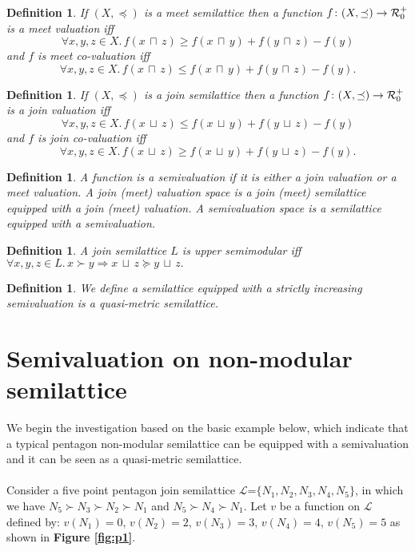 \documentclass{article}
\newtheorem{definition}[theorem]{\bf Definition}
\begin{document}
\begin{definition}

If $(X,\preceq)$ is a meet semilattice then a
 function $f \colon (X,\preceq) \rightarrow \mbox{$\cal{R}$}^{+}_{0}$ is a {\it
 meet valuation} iff 
$$\forall x,y,z\in X. \, f(x \, \sqcap \,  z) \geq f(x \, \sqcap \, 
y) + f(y \, \sqcap \,  z) - f(y) $$ and $f$ is {\it meet co-valuation} iff $$\forall
x,y,z\in X. \, f(x \, \sqcap \,  z) \leq f(x \, \sqcap \, 
y) + f(y \, \sqcap \,  z) - f(y).$$
\end{definition}

\begin{definition}

If $(X,\preceq)$ is a join semilattice then a
 function $f \colon (X,\preceq) \rightarrow \mbox{$\cal{R}$}^{+}_{0}$ is a
 {\it join valuation} iff $$\forall x,y,z\in X. \, f(x \, \sqcup \,  z) \leq f(x \, \sqcup \,  y) + f(y \, \sqcup \, 
 z) -f(y)   $$ and $f$ is {\it join co-valuation} iff 
$$\forall x,y,z\in X. \, f(x \, \sqcup \,  z) \geq f(x \, \sqcup \,  y) + f(y \, \sqcup \,  z) -f(y)  .$$
\end{definition}

\begin{definition} 
A function is a {\it semivaluation} if it is either a join valuation or a meet valuation. A join (meet) valuation space is a join (meet) semilattice 
equipped with a join (meet) valuation. A {\it semivaluation space} is a
semilattice equipped with a semivaluation. 
\end{definition}

\begin{definition} A join semilattice $L$ is upper semimodular iff $\forall x, y, z \in L. \, x \succ y \Rightarrow x \, \sqcup \,  z \succeq y \, \sqcup \,  z.$
\end{definition}

\begin{definition}
We define a semilattice equipped with a strictly increasing semivaluation is a quasi-metric semilattice. 
\end{definition}




\section{Semivaluation on non-modular semilattice}
We begin the investigation based on the basic example below, which indicate that a typical pentagon non-modular semilattice can be equipped with a semivaluation and it can be seen as a quasi-metric semilattice.\\\\
Consider a five point pentagon join semilattice $\mathcal{L}$=$\{ N_{1},N_{2},N_{3},N_{4},N_{5}\}$, in which we have $N_{5}$$\succ$$N_{3}$$\succ$$N_{2}$$\succ$$N_{1}$ and $N_{5}$$\succ$$N_{4}$$\succ$$N_{1}$. Let $v$ be a function on  $\mathcal{L}$ defined by: $v(N_{1})=0$, $v(N_{2})=2$, $v(N_{3})=3$, $v(N_{4})=4$, $v(N_{5})=5$ as shown in \textbf{Figure \ref{fig:p1}}.
\end{document}
